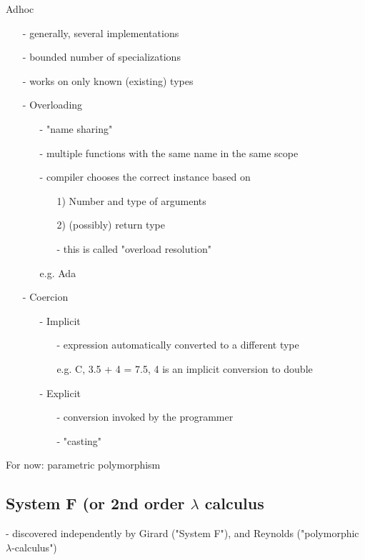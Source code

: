\documentclass[11pt]{article}
\begin{document}
Adhoc
\begin{itemize}
	\item[-] generally, several implementations
	\item[-] bounded number of specializations
	\item[-] works on only known (existing) types
	\item[-] Overloading
	\begin{itemize}
		\item[-] "name sharing"
		\item[-] multiple functions with the same name in the same scope
		\item[-] compiler chooses the correct instance based on 
			\begin{itemize}
				\item[1)] Number and type of arguments
				\item[2)] (possibly) return type
				\item[-] this is called "overload resolution"
			\end{itemize}
		\item[e.g.] Ada
	\end{itemize}
	\item[-] Coercion
	\begin{itemize}
		\item[-] Implicit
		\begin{itemize}
			\item[-] expression automatically converted to a different type
			\item[e.g.] C, 3.5 + 4 = 7.5, 4 is an implicit conversion to double
		\end{itemize}
		\item[-] Explicit
		\begin{itemize}
			\item[-] conversion invoked by the programmer 
			\item[-] "casting"
		\end{itemize}
	\end{itemize}
\end{itemize}

For now: parametric polymorphism \\

\subsection{System F (or 2nd order $\lambda$ calculus}

- discovered independently by Girard ("System F"), and Reynolds ("polymorphic $\lambda$-calculus") \\
\end{document}
